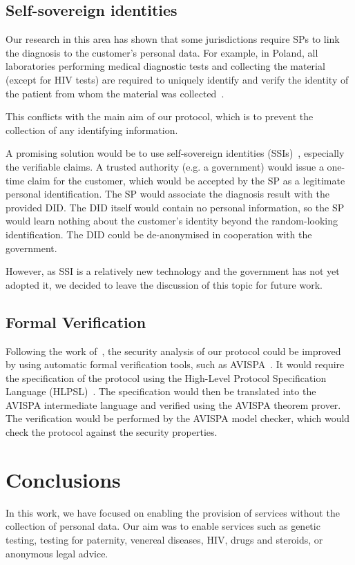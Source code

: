 \documentclass[pdftex,twocolumn,epjc3]{svjour3}
\begin{document}
{\subsection{Self-sovereign identities}
Our research in this area has shown that some jurisdictions require SPs to link the diagnosis to the customer's personal data. For example, in Poland, all laboratories performing medical diagnostic tests and collecting the material (except for HIV tests) are required to uniquely identify and verify the identity of the patient from whom the material was collected~\cite{ministerstwozdrowiaRegulationMinisterHealth2006}.

This conflicts with the main aim of our protocol, which is to prevent the collection of any identifying information.

A promising solution would be to use self-sovereign identities (SSIs)~\cite{muhleSurveyEssentialComponents2018}, especially the verifiable claims. A trusted authority (e.g. a government) would issue a one-time claim for the customer, which would be accepted by the SP as a legitimate personal identification. The SP would associate the diagnosis result with the provided DID. The DID itself would contain no personal information, so the SP would learn nothing about the customer's identity beyond the random-looking identification. The DID could be de-anonymised in cooperation with the government.

However, as SSI is a relatively new technology and the government has not yet adopted it, we decided to leave the discussion of this topic for future work.

\subsection{Formal Verification}\label{sec:formal-verification}
Following the work of~\cite{birjoveanuFormalVerificationMultiparty2022}, the security analysis of our protocol could be improved by using automatic formal verification tools, such as AVISPA~\cite{armandoAVISPAToolAutomated2005}. It would require the specification of the protocol using the High-Level Protocol Specification Language (HLPSL)~\cite{chevalierHighLevelProtocol2004}. The specification would then be translated into the AVISPA intermediate language and verified using the AVISPA theorem prover. The verification would be performed by the AVISPA model checker, which would check the protocol against the security properties.

\section{Conclusions}\label{sec:conclusion}
In this work, we have focused on enabling the provision of services without the collection of personal data. Our aim was to enable services such as genetic testing, testing for paternity, venereal diseases, HIV, drugs and steroids, or anonymous legal advice.

}
\end{document}
